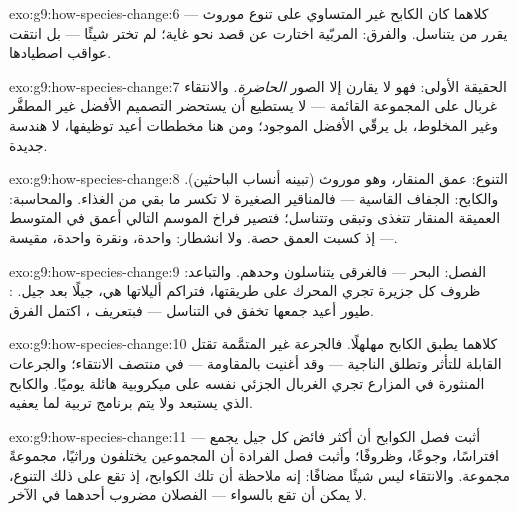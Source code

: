 \begin{solution}{exo:g9:how-species-change:6}
كلاهما كان الكابح غير المتساوي على تنوع موروث --- يقرر
من يتناسل. والفرق: المربّية اختارت عن قصد نحو غاية؛
 لم تختر شيئًا --- بل انتقت عواقب اصطيادها.
\end{solution}

\begin{solution}{exo:g9:how-species-change:7}
الحقيقة الأولى: فهو لا يقارن إلا الصور \emph{الحاضرة}.
والانتقاء غربال على المجموعة القائمة --- لا يستطيع أن
يستحضر التصميم الأفضل غير المطفَّر وغير المخلوط، بل
يرقّي الأفضل الموجود؛ ومن هنا مخططات  أعيد
توظيفها، لا هندسة جديدة.
\end{solution}

\begin{solution}{exo:g9:how-species-change:8}
التنوع: عمق المنقار، وهو موروث (تبينه أنساب الباحثين).
والكابح:  الجفاف القاسية --- فالمناقير الصغيرة لا
تكسر ما بقي من الغذاء. والمحاسبة:  العميقة المنقار
تتغذى وتبقى وتتناسل؛ فتصير فراخ الموسم التالي أعمق في
المتوسط --- إذ كسبت  العمق حصة. ولا انشطار: 
واحدة، ونقرة واحدة، مقيسة.
\end{solution}

\begin{solution}{exo:g9:how-species-change:9}
الفصل: البحر --- فالغرقى يتناسلون وحدهم. والتباعد: ظروف
كل جزيرة تجري المحرك على طريقتها، فتراكم أليلاتها هي،
جيلًا بعد جيل. : طيور أعيد جمعها تخفق في التناسل
--- فبتعريف ، اكتمل الفرق.
\end{solution}

\begin{solution}{exo:g9:how-species-change:10}
كلاهما يطبق الكابح مهلهلًا. فالجرعة غير المتمَّمة تقتل
القابلة للتأثر وتطلق الناجية --- وقد أغنيت بالمقاومة ---
في منتصف الانتقاء؛ والجرعات المنثورة في المزارع تجري
الغربال الجزئي نفسه على  ميكروبية هائلة يوميًا.
والكابح الذي يستبعد ولا يتم برنامج تربية لما يعفيه.
\end{solution}

\begin{solution}{exo:g9:how-species-change:11}
أثبت فصل الكوابح أن أكثر فائض كل جيل يجمع --- افتراسًا،
وجوعًا، وظروفًا؛ وأثبت فصل الفرادة أن المجموعين يختلفون
وراثيًا، مجموعةً مجموعة. والانتقاء ليس شيئًا مضافًا: إنه
ملاحظة أن تلك الكوابح، إذ تقع على ذلك التنوع، لا يمكن أن
تقع بالسواء --- الفصلان مضروب أحدهما في الآخر.
\end{solution}

